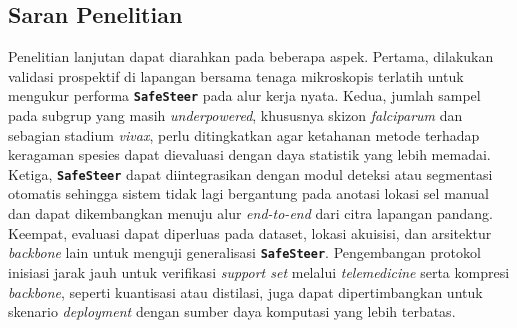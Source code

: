 \documentclass[conference]{IEEEtran}
\newcommand{\nama}[1]{\textbf{\texttt{#1}}}
\begin{document}
\subsection{Saran Penelitian}
Penelitian lanjutan dapat diarahkan pada beberapa aspek. Pertama, dilakukan validasi prospektif di lapangan bersama tenaga mikroskopis terlatih untuk mengukur performa \nama{SafeSteer} pada alur kerja nyata. Kedua, jumlah sampel pada subgrup yang masih \textit{underpowered}, khususnya skizon \textit{falciparum} dan sebagian stadium \textit{vivax}, perlu ditingkatkan agar ketahanan metode terhadap keragaman spesies dapat dievaluasi dengan daya statistik yang lebih memadai. Ketiga, \nama{SafeSteer} dapat diintegrasikan dengan modul deteksi atau segmentasi otomatis sehingga sistem tidak lagi bergantung pada anotasi lokasi sel manual dan dapat dikembangkan menuju alur \textit{end-to-end} dari citra lapangan pandang. Keempat, evaluasi dapat diperluas pada dataset, lokasi akuisisi, dan arsitektur \textit{backbone} lain untuk menguji generalisasi \nama{SafeSteer}. Pengembangan protokol inisiasi jarak jauh untuk verifikasi \textit{support set} melalui \textit{telemedicine} serta kompresi \textit{backbone}, seperti kuantisasi atau distilasi, juga dapat dipertimbangkan untuk skenario \textit{deployment} dengan sumber daya komputasi yang lebih terbatas.
\end{document}
